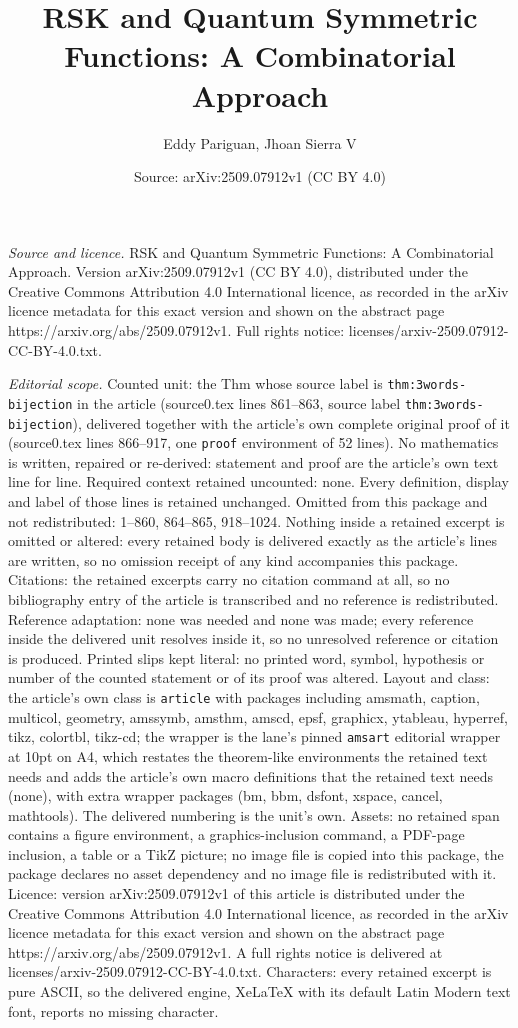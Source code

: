 \documentclass[10pt,a4paper]{amsart}
\title[RSK and Quantum Symmetric Functions: A Combinatorial Approac]{RSK and Quantum Symmetric Functions: A Combinatorial Approach}
\author{Eddy Pariguan, Jhoan Sierra V}
\date{Source: arXiv:2509.07912v1 (CC BY 4.0)}
\begin{document}
\maketitle

\noindent\emph{Source and licence.} RSK and Quantum Symmetric Functions: A Combinatorial Approach. Version arXiv:2509.07912v1 (CC BY 4.0), distributed under the Creative Commons Attribution 4.0 International licence, as recorded in the arXiv licence metadata for this exact version and shown on the abstract page https://arxiv.org/abs/2509.07912v1. Full rights notice: licenses/arxiv-2509.07912-CC-BY-4.0.txt.\par\smallskip

\noindent\textit{Editorial scope.} Counted unit: the Thm whose source label is \texttt{thm:3words-bijection} in the article (source0.tex lines 861--863, source label \texttt{thm:3words-bijection}), delivered together with the article's own complete original proof of it (source0.tex lines 866--917, one \texttt{proof} environment of 52 lines). No mathematics is written, repaired or re-derived: statement and proof are the article's own text line for line. Required context retained uncounted: none. Every definition, display and label of those lines is retained unchanged. Omitted from this package and not redistributed: 1--860, 864--865, 918--1024. Nothing inside a retained excerpt is omitted or altered: every retained body is delivered exactly as the article's lines are written, so no omission receipt of any kind accompanies this package. Citations: the retained excerpts carry no citation command at all, so no bibliography entry of the article is transcribed and no reference is redistributed. Reference adaptation: none was needed and none was made; every reference inside the delivered unit resolves inside it, so no unresolved reference or citation is produced. Printed slips kept literal: no printed word, symbol, hypothesis or number of the counted statement or of its proof was altered. Layout and class: the article's own class is \texttt{article} with packages including amsmath, caption, multicol, geometry, amssymb, amsthm, amscd, epsf, graphicx, ytableau, hyperref, tikz, colortbl, tikz-cd; the wrapper is the lane's pinned \texttt{amsart} editorial wrapper at 10pt on A4, which restates the theorem-like environments the retained text needs and adds the article's own macro definitions that the retained text needs (none), with extra wrapper packages (bm, bbm, dsfont, xspace, cancel, mathtools). The delivered numbering is the unit's own. Assets: no retained span contains a figure environment, a graphics-inclusion command, a PDF-page inclusion, a table or a TikZ picture; no image file is copied into this package, the package declares no asset dependency and no image file is redistributed with it. Licence: version arXiv:2509.07912v1 of this article is distributed under the Creative Commons Attribution 4.0 International licence, as recorded in the arXiv licence metadata for this exact version and shown on the abstract page https://arxiv.org/abs/2509.07912v1. A full rights notice is delivered at licenses/arxiv-2509.07912-CC-BY-4.0.txt. Characters: every retained excerpt is pure ASCII, so the delivered engine, XeLaTeX with its default Latin Modern text font, reports no missing character.
\end{document}

